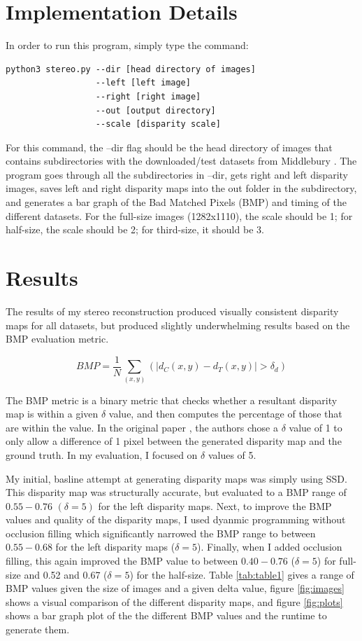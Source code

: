 \documentclass[11pt,a4paper]{article}
\begin{document}
\section{Implementation Details}

In order to run this program, simply type the command: 
\begin{Verbatim}[fontsize=\small]
python3 stereo.py --dir [head directory of images] 
                  --left [left image] 
                  --right [right image] 
                  --out [output directory] 
                  --scale [disparity scale]
\end{Verbatim}
For this command, the --dir flag should be the head directory of images that contains subdirectories 
 with the downloaded/test datasets from Middlebury \cite{Hirschmller2007EvaluationOC}. The program goes 
 through all the subdirectories in --dir, gets right and left disparity images, saves left and right disparity 
 maps into the out folder in the subdirectory, and generates a bar graph of the Bad Matched Pixels (BMP)
  and timing of the different datasets. For the full-size images (1282x1110), the scale should be 1; for 
  half-size, the scale should be 2; for third-size, it should be 3.

\section{Results}

The results of my stereo reconstruction produced visually consistent disparity maps for all datasets, 
but produced slightly underwhelming results based on the BMP evaluation metric. 

$$BMP = \frac{1}{N} \sum_{(x, y)} (|d_{C}(x, y) - d_{T}(x, y)| > \delta_{d})$$

The BMP metric is a binary metric that checks whether a resultant disparity map is within a given $\delta$ value,
 and then computes the percentage of those that are within the value. In the original paper \cite{BMP}, the authors 
 chose a $\delta$ value of 1 to only allow a difference of 1 pixel between the generated disparity map and the ground 
 truth. In my evaluation, I focused on $\delta$ values of 5.

My initial, basline attempt at generating disparity maps was simply using SSD. This disparity map was structurally accurate, 
 but evaluated to a BMP range of $0.55-0.76$ $(\delta = 5)$ for the left disparity maps. Next, to
 improve the BMP values and quality of the disparity maps, I used dyanmic programming without occlusion filling which significantly narrowed
 the BMP range to between $0.55-0.68$ for the left disparity maps ($\delta = 5$). Finally, when I added occlusion filling, this again improved the BMP value 
 to between $0.40-0.76$ ($\delta = 5$) for full-size and 0.52 and 0.67 ($\delta = 5$) for the half-size. Table \ref{tab:table1} gives a range of 
 BMP values given the size of images and a given delta value, figure \ref{fig:images} shows a visual comparison of the different disparity maps, 
 and figure \ref{fig:plots} shows a bar graph plot of the the different BMP values and the runtime to generate them.
\end{document}
